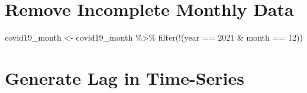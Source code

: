 \documentclass[
]{book}
\newenvironment{Shaded}{\begin{snugshade}}{\end{snugshade}}
\newcommand{\DecValTok}[1]{\textcolor[rgb]{0.00,0.00,0.81}{#1}}
\newcommand{\FunctionTok}[1]{\textcolor[rgb]{0.00,0.00,0.00}{#1}}
\newcommand{\NormalTok}[1]{#1}
\newcommand{\OtherTok}[1]{\textcolor[rgb]{0.56,0.35,0.01}{#1}}
\newcommand{\SpecialCharTok}[1]{\textcolor[rgb]{0.00,0.00,0.00}{#1}}
\begin{document}
\hypertarget{remove-incomplete-monthly-data}{%
\section{Remove Incomplete Monthly Data}\label{remove-incomplete-monthly-data}}

\begin{Shaded}
\begin{Highlighting}[]
\NormalTok{covid19\_month }\OtherTok{\textless{}{-}}\NormalTok{ covid19\_month }\SpecialCharTok{\%\textgreater{}\%}
  \FunctionTok{filter}\NormalTok{(}\SpecialCharTok{!}\NormalTok{(year }\SpecialCharTok{==} \DecValTok{2021} \SpecialCharTok{\&}\NormalTok{ month }\SpecialCharTok{==} \DecValTok{12}\NormalTok{))}
\end{Highlighting}
\end{Shaded}

\hypertarget{generate-lag-in-time-series}{%
\section{Generate Lag in Time-Series}\label{generate-lag-in-time-series}}
\end{document}
